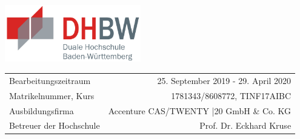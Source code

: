 
\begin{titlepage}
\begin{flushright}
\includegraphics[height=2.5cm]{images/dhbw.png}
\end{flushright}
\begin{center}
\end{center}
\vfill
\begin{tabularx}{\textwidth}{Xr}
    Bearbeitungszeitraum & 25. September 2019 - 29. April 2020 \\
    Matrikelnummer, Kurs & 1781343/8608772, TINF17AIBC \\
    Ausbildungsfirma & Accenture CAS/TWENTY |20 GmbH \& Co. KG \\
    Betreuer der Hochschule & Prof. Dr. Eckhard Kruse
\end{tabularx}
\end{titlepage}



 
 

\tableofcontents

